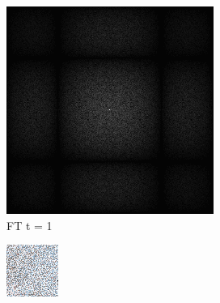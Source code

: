 \begin{figure}[H]
\begin{tcolorbox}[boxrule=4pt,sharp corners=downhill,title=Bedeutung des Retargeting]
\begin{subfigure}[b]{0.2\linewidth}
        \includegraphics[width=\linewidth]{content/TemporalerAlg/Bilder/Retargeting/Bedeutung Retargeting/Sorting_Small_Block_WithRetargeting/Spektrum/Ausschnitt2.png}
         \caption{FT t = 1}
         \label{pic:retarget_t1}
    \end{subfigure}
    \begin{subfigure}[b]{0.2\linewidth}
        \includegraphics[width=\linewidth]{content/TemporalerAlg/Bilder/Retargeting/Bedeutung Retargeting/Sorting_Small_Block_WithRetargeting/Ausschnitt/Ausschnitt3.png}

\end{subfigure}
\end{tcolorbox}
\end{figure}

